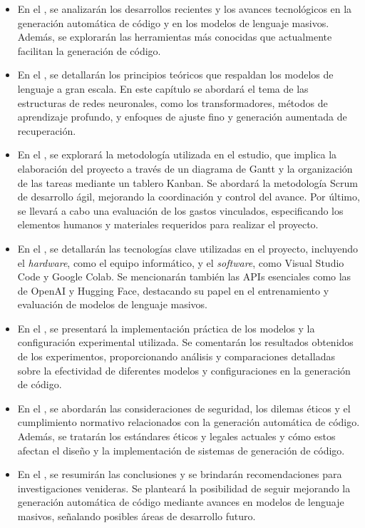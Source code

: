 \begin{itemize}
    \item En el , se analizarán los desarrollos recientes y los avances tecnológicos en la generación automática de código y en los modelos de lenguaje masivos. Además, se explorarán las herramientas más conocidas que actualmente facilitan la generación de código.
    
    \item En el , se detallarán los principios teóricos que respaldan los modelos de lenguaje a gran escala. En este capítulo se abordará el tema de las estructuras de redes neuronales, como los transformadores, métodos de aprendizaje profundo, y enfoques de ajuste fino y generación aumentada de recuperación.
    
    \item En el , se explorará la metodología utilizada en el estudio, que implica la elaboración del proyecto a través de un diagrama de Gantt y la organización de las tareas mediante un tablero Kanban. Se abordará la metodología Scrum de desarrollo ágil, mejorando la coordinación y control del avance. Por último, se llevará a cabo una evaluación de los gastos vinculados, especificando los elementos humanos y materiales requeridos para realizar el proyecto.
    
    \item En el , se detallarán las tecnologías clave utilizadas en el proyecto, incluyendo el \textit{hardware}, como el equipo informático, y el \textit{software}, como Visual Studio Code y Google Colab. Se mencionarán también las \acrshort{API}s esenciales como las de OpenAI y Hugging Face, destacando su papel en el entrenamiento y evaluación de modelos de lenguaje masivos.
    
    \item En el , se presentará la implementación práctica de los modelos y la configuración experimental utilizada. Se comentarán los resultados obtenidos de los experimentos, proporcionando análisis y comparaciones detalladas sobre la efectividad de diferentes modelos y configuraciones en la generación de código.
    
    \item En el , se abordarán las consideraciones de seguridad, los dilemas éticos y el cumplimiento normativo relacionados con la generación automática de código. Además, se tratarán los estándares éticos y legales actuales y cómo estos afectan el diseño y la implementación de sistemas de generación de código.
    
    \item En el , se resumirán las conclusiones y se brindarán recomendaciones para investigaciones venideras. Se planteará la posibilidad de seguir mejorando la generación automática de código mediante avances en modelos de lenguaje masivos, señalando posibles áreas de desarrollo futuro.
\end{itemize}


